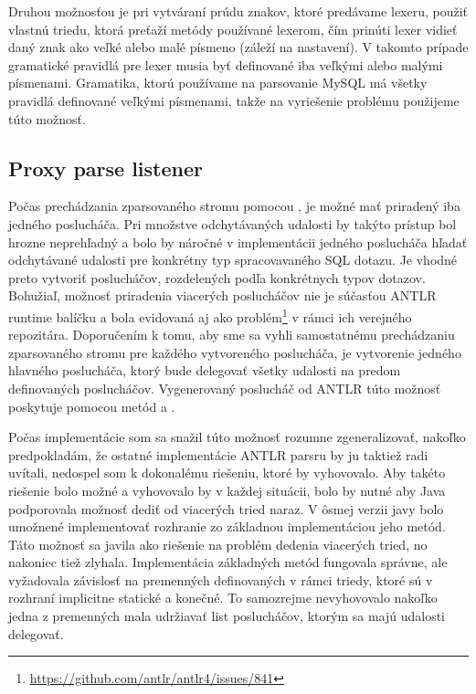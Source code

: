 Druhou možnosťou je pri vytváraní prúdu znakov, ktoré predávame lexeru, použiť vlastnú triedu, ktorá preťaží metódy používané lexerom, čím prinúti lexer vidieť daný znak ako veľké alebo malé písmeno (záleží na nastavení). V takomto prípade gramatické pravidlá pre lexer musia byť definované iba veľkými alebo malými písmenami. Gramatika, ktorú používame na parsovanie MySQL má všetky pravidlá definované veľkými písmenami, takže na vyriešenie problému použijeme túto možnosť. 

\subsection{Proxy parse listener}
Počas prechádzania zparsovaného stromu pomocou , je možné mať priradený iba jedného poslucháča. Pri množstve odchytávaných udalosti by takýto prístup bol hrozne neprehľadný a bolo by náročné v implementácii jedného poslucháča hľadať odchytávané udalosti pre konkrétny typ spracovavaného SQL dotazu. Je vhodné preto vytvoriť poslucháčov, rozdelených podľa konkrétnych typov dotazov. Bohužiaľ, možnosť priradenia viacerých poslucháčov nie je súčasťou ANTLR runtime balíčku a bola evidovaná aj ako problém\footnote{\url{https://github.com/antlr/antlr4/issues/841}} v rámci ich verejného repozitára. Doporučením k tomu, aby sme sa vyhli samostatnému prechádzaniu zparsovaného stromu pre každého vytvoreného poslucháča, je vytvorenie jedného hlavného poslucháča, ktorý bude delegovať všetky udalosti na predom definovaných poslucháčov. Vygenerovaný poslucháč od ANTLR túto možnosť poskytuje pomocou metód  a .

Počas implementácie som sa snažil túto možnosť rozumne zgeneralizovať, nakoľko predpokladám, že ostatné implementácie ANTLR parsru by ju taktiež radi uvítali, nedospel som k dokonalému riešeniu, ktoré by vyhovovalo. Aby takéto riešenie bolo možné a vyhovovalo by v každej situácii, bolo by nutné aby Java podporovala možnosť dediť od viacerých tried naraz. V ôsmej verzii javy bolo umožnené implementovať rozhranie zo základnou implementáciou jeho metód. Táto možnosť sa javila ako riešenie na problém dedenia viacerých tried, no nakoniec tiež zlyhala. Implementácia základných metód fungovala správne, ale vyžadovala závislosť na premenných definovaných v rámci triedy, ktoré sú v rozhraní implicitne statické a konečné. To samozrejme nevyhovovalo nakoľko jedna z premenných mala udržiavať list poslucháčov, ktorým sa majú udalosti delegovať.

